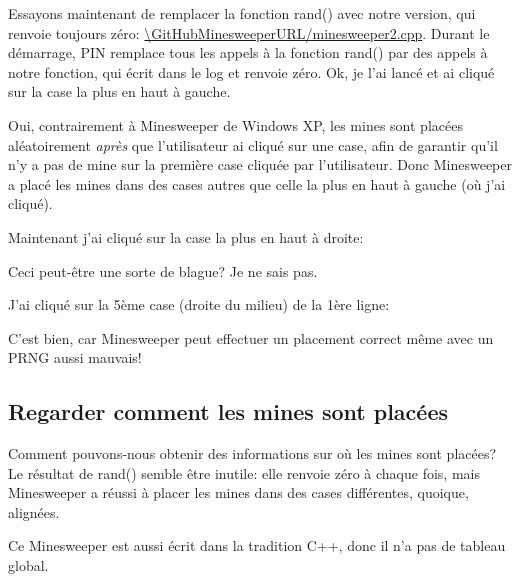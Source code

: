 Essayons maintenant de remplacer la fonction rand() avec notre version, qui renvoie
toujours zéro: \url{\GitHubMinesweeperURL/minesweeper2.cpp}.
Durant le démarrage, PIN remplace tous les appels à la fonction rand() par des appels
à notre fonction, qui écrit dans le log et renvoie zéro.
Ok, je l'ai lancé et ai cliqué sur la case la plus en haut à gauche.

\begin{figure}[H]
\centering
{}
\end{figure}

Oui, contrairement à Minesweeper de Windows XP, les mines sont placées aléatoirement
\emph{après} que l'utilisateur ai cliqué sur une case, afin de garantir qu'il n'y
a pas de mine sur la première case cliquée par l'utilisateur.
Donc Minesweeper a placé les mines dans des cases autres que celle la plus en
haut à gauche (où j'ai cliqué).

Maintenant j'ai cliqué sur la case la plus en haut à droite:

\begin{figure}[H]
\centering
{}
\end{figure}

Ceci peut-être une sorte de blague? Je ne sais pas.

J'ai cliqué sur la 5ème case (droite du milieu) de la 1ère ligne:

\begin{figure}[H]
\centering
{}
\end{figure}

C'est bien, car Minesweeper peut effectuer un placement correct même avec un \ac{PRNG}
aussi mauvais!

\subsection{Regarder comment les mines sont placées}

Comment pouvons-nous obtenir des informations sur où les mines sont placées?
Le résultat de rand() semble être inutile: elle renvoie zéro à chaque fois, mais
Minesweeper a réussi à placer les mines dans des cases différentes, quoique, alignées.

Ce Minesweeper est aussi écrit dans la tradition C++, donc il n'a pas de tableau
global.

